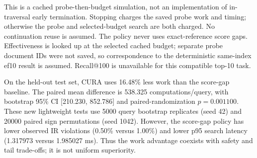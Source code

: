 \documentclass[10pt,twocolumn]{article}
\newcommand{\cura}{CURA}
\begin{document}
This is a cached probe-then-budget simulation, not an implementation of in-traversal early termination. Stopping charges the saved probe work and timing; otherwise the probe and selected-budget search are both charged. No continuation reuse is assumed. The policy never uses exact-reference score gaps. Effectiveness is looked up at the selected cached budget; separate probe document IDs were not saved, so correspondence to the deterministic same-index ef10 result is assumed. Recall@100 is unavailable for this compatible top-10 task.

\begin{table}[!t]
\centering
\caption{Cached score-gap policy compared within the same 200 MS MARCO test and 43 TREC OOD queries. Timings are saved search estimates, not end-to-end request latency.}
\label{tab:score_gap_budget}
\end{table}

On the held-out test set, \cura{} uses 16.48\% less work than the score-gap baseline. The paired mean difference is 538.325 computations/query, with bootstrap 95\% CI [210.230, 852.786] and paired-randomization $p=0.001100$. These new lightweight tests use 5000 query bootstrap replicates (seed 42) and 20000 paired sign permutations (seed 1042). However, the score-gap policy has lower observed IR violations (0.50\% versus 1.00\%) and lower p95 search latency (1.317973 versus 1.985027 ms). Thus the work advantage coexists with safety and tail trade-offs; it is not uniform superiority.
\end{document}
